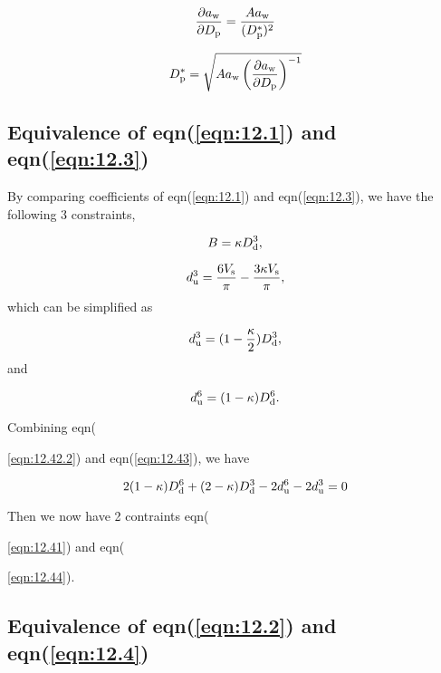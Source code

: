 \documentclass[12pt]{article}
\begin{document}
{\begin{equation}\label{eqn:12.5.2}
\frac{\partial a_{\rm w}}{\partial D_{\rm p}}=\frac{A a_{\rm w}}{(D_{\rm p}^{*})^{2}}
\end{equation} 

\begin{equation}\label{eqn:12.5.3}
D_{\rm p}^{*}=\sqrt{A a_{\rm w} \left(\frac{\partial a_{\rm w}}{\partial D_{\rm p}}\right)^{-1}} 
\end{equation} 



\subsection{Equivalence of eqn(\ref{eqn:12.1}) and eqn(\ref{eqn:12.3})}

By comparing coefficients of eqn(\ref{eqn:12.1}) and eqn(\ref{eqn:12.3}), we have the following 3 constraints,

\begin{equation}\label{eqn:12.41}
B=\kappa D_{\rm d}^{3},
\end{equation}

\begin{equation}\label{eqn:12.42.1}
d_{\rm u}^{3}=\frac{6V_{\rm s}}{\pi} - \frac{3 \kappa V_{\rm s}}{\pi},
\end{equation}
which can be simplified as 

\begin{equation}\label{eqn:12.42.2}
d_{\rm u}^{3}=(1-\frac{\kappa}{2}) D_{\rm d}^{3} ,
\end{equation}
and 

\begin{equation}\label{eqn:12.43}
d_{\rm u}^{6}=(1-\kappa) D_{\rm d}^{6}.
\end{equation}

Combining eqn({\ref{eqn:12.42.2}) and eqn(\ref{eqn:12.43}), we have

\begin{equation}\label{eqn:12.44}
2(1-\kappa) D_{\rm d}^{6}+(2-\kappa)D_{\rm d}^{3}-2d_{\rm u}^{6}-2d_{\rm u}^{3}=0
\end{equation}

Then we now have 2 contraints eqn({\ref{eqn:12.41}) and eqn({\ref{eqn:12.44}).

\subsection{Equivalence of eqn(\ref{eqn:12.2}) and eqn(\ref{eqn:12.4})}

}}}}
\end{document}
